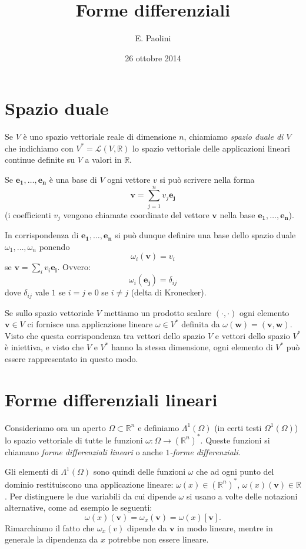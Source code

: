 \documentclass[italian,a4paper]{scrartcl}
\title{Forme differenziali}
\author{E. Paolini}
\date{26 ottobre 2014}
\newcommand{\RR}{{\mathbb R}}
\newcommand{\defeq}{=}
\renewcommand{\vec}{\mathbf}
\begin{document}
\maketitle

\section{Spazio duale}

Se $V$ è uno spazio vettoriale reale di dimensione $n$, chiamiamo
\emph{spazio duale di $V$} che indichiamo con $V^* =
\mathcal L (V,\RR)$ lo spazio vettoriale delle applicazioni lineari
continue definite su $V$ a valori in $\RR$.

Se $\vec{e_1},\dots, \vec{e_n}$ è una base di $V$ ogni vettore $v$ si può scrivere
nella forma
\[
  \vec v = \sum_{j=1}^n v_j \vec {e_j}
\]
(i coefficienti $v_j$ vengono chiamate coordinate del vettore $\vec v$
nella base $\vec{e_1},\dots, \vec{e_n}$).

In corrispondenza di $\vec{e_1},\dots, \vec{e_n}$ si può dunque definire una base
dello spazio duale $\omega_1,\dots,\omega_n$ ponendo
\[
  \omega_i (\vec v) \defeq v_i
\]
se $\vec v = \sum_i v_i \vec{e_i}$.
Ovvero:
\[
  \omega_i(\vec{e_j}) = \delta_{ij}
\]
dove $\delta_{ij}$ vale $1$ se $i=j$ e $0$ se $i\neq j$ (delta di
Kronecker).

Se sullo spazio vettoriale $V$ mettiamo un prodotto scalare $(\cdot
,\cdot)$ ogni elemento $\vec v\in V$ ci fornisce una applicazione lineare
$\omega \in V^*$ definita da $\omega(\vec w) = (\vec v,\vec w)$. Visto che questa
corrispondenza tra vettori dello spazio $V$ e vettori dello spazio
$V^*$ è iniettiva, e visto che $V$ e $V^*$ hanno la stessa dimensione,
ogni elemento di $V^*$ può essere rappresentato in questo modo.

\section{Forme differenziali lineari}

Consideriamo ora un aperto $\Omega\subset \RR^n$ e definiamo
$\Lambda^1(\Omega)$ (in certi testi $\Omega^1(\Omega)$) lo spazio
vettoriale di tutte le funzioni $\omega\colon \Omega \to (\RR^n)^*$.
Queste funzioni si chiamano \emph{forme differenziali lineari} o
anche \emph{$1$-forme differenziali}.

Gli elementi di $\Lambda^1(\Omega)$ sono quindi delle funzioni
$\omega$ che ad
ogni punto del dominio restituiscono una applicazione lineare:
$\omega(x) \in (\RR^n)^*$, $\omega(x)(\vec v) \in \RR$. Per distinguere le
due variabili da cui dipende $\omega$ si usano a volte delle notazioni
alternative, come ad esempio le seguenti:
\[
\omega(x)(\vec v) = \omega_x(\vec v) = \omega(x)[\vec v].
\]
Rimarchiamo il fatto che $\omega_x(v)$ dipende da $\vec v$ in modo
lineare, mentre in generale la dipendenza da $x$ potrebbe non essere lineare.
\end{document}
